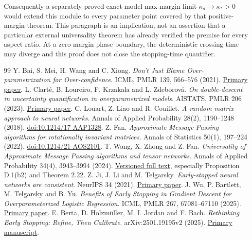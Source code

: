 \documentclass[
  11pt,
  a4paper,
]{article}
\begin{document}
Consequently a separately proved exact-model max-margin limit
\(\kappa_d\to\kappa_*>0\) would extend this module to every parameter
point covered by that positive-margin theorem. This paragraph is an
implication, not an assertion that a particular external universality
theorem has already verified the premise for every aspect ratio. At a
zero-margin phase boundary, the deterministic crossing time may diverge
and this proof does not close the stopping-time quantifier.

\clearpage

\begin{thebibliography}{99}
  Y. Bai, S. Mei, H. Wang and C. Xiong. \emph{Don't Just Blame
  Over-parametrization for Over-confidence}. ICML, PMLR 139, 566--576
  (2021). \href{https://proceedings.mlr.press/v139/bai21c.html}{Primary
  paper}.
  L. Clarté, B. Loureiro, F. Krzakala and L. Zdeborová. \emph{On
  double-descent in uncertainty quantification in overparametrized
  models}. AISTATS, PMLR 206 (2023).
  \href{https://proceedings.mlr.press/v206/clarte23a.html}{Primary
  paper}.
  C. Louart, Z. Liao and R. Couillet. \emph{A random matrix approach to
  neural networks}. Annals of Applied Probability 28(2), 1190--1248
  (2018).
  \href{https://doi.org/10.1214/17-AAP1328}{doi:10.1214/17-AAP1328}.
  Z. Fan. \emph{Approximate Message Passing algorithms for rotationally
  invariant matrices}. Annals of Statistics 50(1), 197--224 (2022).
  \href{https://doi.org/10.1214/21-AOS2101}{doi:10.1214/21-AOS2101}.
  T. Wang, X. Zhong and Z. Fan. \emph{Universality of Approximate
  Message Passing algorithms and tensor networks}. Annals of Applied
  Probability 34(4), 3943--3994 (2024).
  \href{https://arxiv.org/html/2206.13037v5}{Versioned full text},
  especially Proposition D.1(b2) and Theorem 2.22.
  Z. Ji, J. Li and M. Telgarsky. \emph{Early-stopped neural networks are
  consistent}. NeurIPS 34 (2021).
  \href{https://proceedings.neurips.cc/paper/2021/file/0e1ebad68af7f0ae4830b7ac92bc3c6f-Paper.pdf}{Primary
  paper}.
  J. Wu, P. Bartlett, M. Telgarsky and B. Yu. \emph{Benefits of Early
  Stopping in Gradient Descent for Overparameterized Logistic
  Regression}. ICML, PMLR 267, 67081--67110 (2025).
  \href{https://proceedings.mlr.press/v267/wu25b.html}{Primary paper}.
  E. Berta, D. Holzmüller, M. I. Jordan and F. Bach. \emph{Rethinking
  Early Stopping: Refine, Then Calibrate}. arXiv:2501.19195v2 (2025).
  \href{https://arxiv.org/html/2501.19195v2}{Primary manuscript}.

\end{thebibliography}
\end{document}
